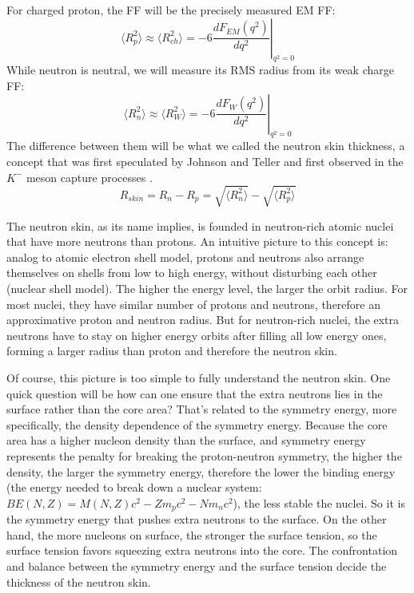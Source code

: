 For charged proton, the FF will be the precisely measured EM FF:
\begin{equation}
    \langle R_p^2 \rangle \approx \langle R_{ch}^2 \rangle= -6 \left. \frac{dF_{EM}(q^2)}{dq^2} \right|_{q^2 = 0}
\end{equation}
While neutron is neutral, we will measure its RMS radius from its weak charge
FF:
\begin{equation}
    \langle R_n^2 \rangle \approx \langle R_W^2 \rangle = -6 \left. \frac{dF_{W}(q^2)}{dq^2} \right|_{q^2 = 0}
\end{equation}
The difference between them will be what we called the neutron skin thickness,
a concept that was first speculated by Johnson and Teller \cite{PhysRev.93.357}
and first observed in the $K^-$ meson capture processes \cite{BURHOP1969625}.
\begin{equation}
    R_{skin} = R_n - R_p = \sqrt{\langle R_n^2 \rangle} - \sqrt{\langle R_p^2 \rangle}
\end{equation}

The neutron skin, as its name implies, is founded in neutron-rich atomic nuclei that
have more neutrons than protons. An intuitive picture to this concept is: analog to
atomic electron shell model, protons and neutrons also arrange themselves on
shells from low to high energy, without disturbing each other (nuclear shell model).
The higher the energy level, the larger the orbit radius.
For most nuclei, they have similar number of protons and neutrons, therefore an 
approximative proton and neutron radius. But for neutron-rich nuclei, the extra neutrons
have to stay on higher energy orbits after filling all low energy ones, forming
a larger radius than proton and therefore the neutron skin.

Of course, this picture is too simple to fully understand the neutron skin.
One quick question will be how can one ensure that the extra neutrons lies 
in the surface rather than the core area? That's related to the symmetry energy, 
more specifically, the density dependence of the symmetry energy. 
Because the core area has a higher nucleon density than the surface, and symmetry energy 
represents the penalty for breaking the proton-neutron symmetry, the higher the density, 
the larger the symmetry energy, therefore the lower the binding energy (the energy
needed to break down a nuclear system: $BE(N, Z) = M(N, Z)c^2 - Zm_p c^2 - Nm_n c^2$), the less
stable the nuclei. So it is the symmetry energy that pushes extra neutrons to 
the surface. On the other hand, the more nucleons on surface, the stronger 
the surface tension, so the surface tension favors squeezing extra neutrons 
into the core. The confrontation and balance between the symmetry energy and 
the surface tension decide the thickness of the neutron skin.

